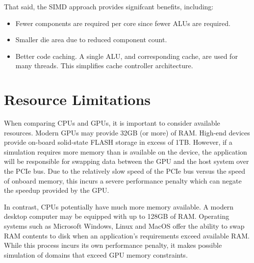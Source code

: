 That said, the SIMD approach provides signifcant benefits, including:

\begin{itemize}
	\item Fewer components are required per core since fewer ALUs are required.
	\item Smaller die area due to reduced component count.
	\item Better code caching. A single ALU, and corresponding cache, are used for many threads. This simplifies cache controller architecture.
\end{itemize}

\section{Resource Limitations}

When comparing CPUs and GPUs, it is important to consider available resources. Modern GPUs may provide 32GB (or more) of RAM.  High-end devices provide on-board solid-state FLASH storage in excess of 1TB. However, if a simulation requires more memory than is available on the device, the application will be responsible for swapping data between the GPU and the host system over the PCIe bus. Due to the relatively slow speed of the PCIe bus versus the speed of onboard memory, this incurs a severe performance penalty which can negate the speedup provided by the GPU. 

In contrast, CPUs potentially have much more memory available. A modern desktop computer may be equipped with up to 128GB of RAM. Operating systems such as Microsoft Windows, Linux and MacOS offer the ability to swap RAM contents to disk when an application's requirements exceed available RAM. While this process incurs its own performance penalty, it makes possible simulation of domains that exceed GPU memory constraints.





